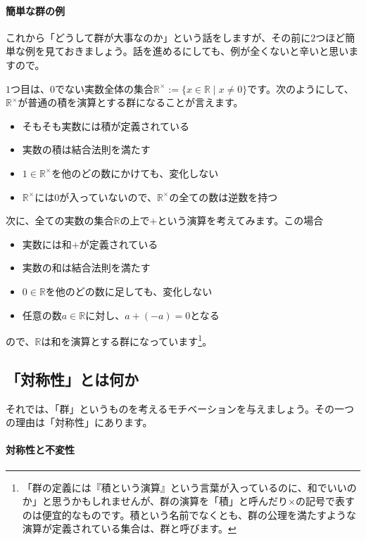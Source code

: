 \paragraph{簡単な群の例} これから「どうして群が大事なのか」という話をしますが、その前に$2$つほど簡単な例を見ておきましょう。話を進めるにしても、例が全くないと辛いと思いますので。

$1$つ目は、$0$でない実数全体の集合$\mathbb{R}^{\times} := \{ x \in \mathbb{R} \mid x \neq 0\}$です。次のようにして、$\mathbb{R}^{\times}$が普通の積を演算とする群になることが言えます。
\begin{itemize}
\item そもそも実数には積が定義されている
\item 実数の積は結合法則を満たす
\item $1 \in \mathbb{R}^{\times}$を他のどの数にかけても、変化しない
\item $\mathbb{R}^{\times}$には$0$が入っていないので、$\mathbb{R}^{\times}$の全ての数は逆数を持つ
\end{itemize}

次に、全ての実数の集合$\mathbb{R}$の上で$+$という演算を考えてみます。この場合
\begin{itemize}
\item 実数には和$+$が定義されている
\item 実数の和は結合法則を満たす
\item $0 \in \mathbb{R}$を他のどの数に足しても、変化しない
\item 任意の数$a \in \mathbb{R}$に対し、$a + (-a) = 0$となる
\end{itemize}
ので、$\mathbb{R}$は和を演算とする群になっています\footnote{「群の定義には『積という演算』という言葉が入っているのに、和でいいのか」と思うかもしれませんが、群の演算を「積」と呼んだり$\times$の記号で表すのは便宜的なものです。積という名前でなくとも、群の公理を満たすような演算が定義されている集合は、群と呼びます。}。


\subsection{「対称性」とは何か}

それでは、「群」というものを考えるモチベーションを与えましょう。その一つの理由は「対称性」にあります。

\paragraph{対称性と不変性}

